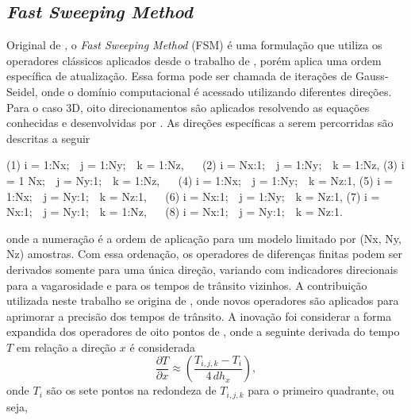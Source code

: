 \subsection{\textit{Fast Sweeping Method}}

Original de , o \textit{Fast Sweeping Method} (FSM) é uma formulação que utiliza os operadores clássicos aplicados desde o trabalho de , porém aplica uma ordem específica de atualização. Essa forma pode ser chamada de iterações de Gauss-Seidel, onde o domínio computacional é acessado utilizando diferentes direções. Para o caso 3D, oito direcionamentos são aplicados resolvendo as equações conhecidas e desenvolvidas por . As direções específicas a serem percorridas são descritas a seguir
\begin{center}
\noindent (1) i = 1:Nx;$\,\,\,\,$ j = 1:Ny;$\,\,\,\,$ k = 1:Nz,$\,\,\,\,\,\,\,\,$ (2) i = Nx:1;$\,\,\,\,$ j = 1:Ny;$\,\,\,\,$ k = 1:Nz, \newline 
\noindent (3) i = 1 Nx;$\,\,\,\,$ j = Ny:1;$\,\,\,\,$ k = 1:Nz,$\,\,\,\,\,\,\,\,$ (4) i = 1:Nx;$\,\,\,\,$ j = 1:Ny;$\,\,\,\,$ k = Nz:1, \newline
\noindent (5) i = 1:Nx;$\,\,\,\,$ j = Ny:1;$\,\,\,\,$ k = Nz:1,$\,\,\,\,\,\,\,\,$ (6) i = Nx:1;$\,\,\,\,$ j = 1:Ny;$\,\,\,\,$ k = Nz:1, \newline 
\noindent (7) i = Nx:1;$\,\,\,\,$ j = Ny:1;$\,\,\,\,$ k = 1:Nz,$\,\,\,\,\,\,\,\,$ (8) i = Nx:1;$\,\,\,\,$ j = Ny:1;$\,\,\,\,$ k = Nz:1. $\,\,\,\,\,\,\,\,\,\,\,\,\,$
\end{center}
\noindent onde a numeração é a ordem de aplicação para um modelo limitado por (Nx, Ny, Nz) amostras. Com essa ordenação, os operadores de diferenças finitas podem ser derivados somente para uma única direção, variando com indicadores direcionais para a vagarosidade e para os tempos de trânsito vizinhos. A contribuição utilizada neste trabalho se origina de , onde novos operadores são aplicados para aprimorar a precisão dos tempos de trânsito. A inovação foi considerar a forma expandida dos operadores de oito pontos de , onde a seguinte derivada do tempo $T$ em relação a direção $x$ é considerada    
\begin{equation}
	\dfrac{\partial T}{\partial x} \approx \left(\dfrac{T_{i,j,k} - T_i}{4\, dh_x}\right),
	\label{fsm_8p_derivative}
\end{equation}
\noindent onde $T_i$ são os sete pontos na redondeza de $T_{i,j,k}$ para o primeiro quadrante, ou seja,
